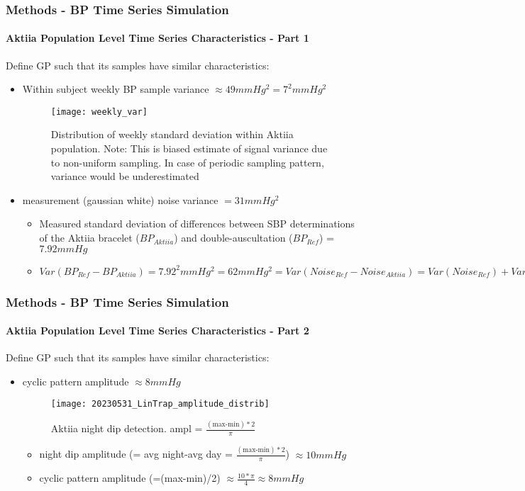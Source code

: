 \documentclass[
	8pt, %
]{beamer}
\begin{document}
\begin{frame}
	\frametitle{Methods - BP Time Series Simulation}
	\framesubtitle{Aktiia Population Level Time Series Characteristics - Part 1}

	Define GP such that its samples have similar characteristics:

	\begin{itemize}
		\item Within subject weekly BP sample variance $\approx 49 mmHg^2 = 7^2 mmHg^2$
			\begin{figure}
					\texttt{[image: weekly\_var]}
					\caption{Distribution of weekly standard deviation within Aktiia population.
					Note: This is biased estimate of signal variance due to non-uniform sampling. In case
					of periodic sampling pattern, variance would be underestimated}
			\end{figure}
		\item measurement (gaussian white) noise variance $=31 mmHg^2$
		\begin{itemize}
			\item Measured standard deviation of differences between SBP determinations of the Aktiia bracelet
			($BP_{Aktiia}$)  and double-auscultation ($BP_{Ref}$) = $7.92 mmHg$
			\item $Var(BP_{Ref} - BP_{Aktiia}) = 7.92^2 mmHg^2 = 62 mmHg^2 = Var(Noise_{Ref} - Noise_{Aktiia})
			= Var(Noise_{Ref}) + Var(Noise_{Aktiia}) - 2COV(Noise_{Ref}, Noise_{Aktiia})$
		\end{itemize}
	\end{itemize}
\end{frame}

\begin{frame}
	\frametitle{Methods - BP Time Series Simulation}
	\framesubtitle{Aktiia Population Level Time Series Characteristics - Part 2}

	Define GP such that its samples have similar characteristics:

	\begin{itemize}
		\item cyclic pattern amplitude $\approx 8 mmHg$
				\begin{figure}
					\texttt{[image: 20230531\_LinTrap\_amplitude\_distrib]}
					\caption{Aktiia night dip detection. ampl = $\frac{(\text{max-min})*2}{\pi}$}
				\end{figure}
		\begin{itemize}
			\item night dip amplitude (= avg night-avg day = $\frac{(\text{max-min})*2}{\pi}$) $ \approx 10 mmHg$
			\item cyclic pattern amplitude (=(max-min)/2) $\approx \frac{10 *\pi}{4} \approx 8 mmHg$
		\end{itemize}

	\end{itemize}

\end{frame}
\end{document}
